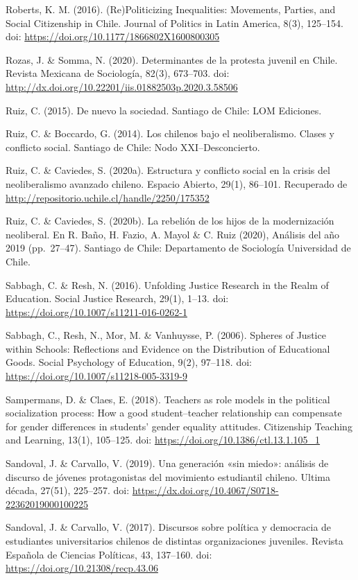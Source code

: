 \documentclass[12pt,twoside]{templates/facsothesis}
\begin{document}
Roberts, K. M. (2016). (Re)Politicizing Inequalities: Movements, Parties, and Social Citizenship in Chile. Journal of Politics in Latin America, 8(3), 125--154. doi: \url{https://doi.org/10.1177/1866802X1600800305}

Rozas, J. \& Somma, N. (2020). Determinantes de la protesta juvenil en Chile. Revista Mexicana de Sociología, 82(3), 673--703. doi: \url{http://dx.doi.org/10.22201/iis.01882503p.2020.3.58506}

Ruiz, C. (2015). De nuevo la sociedad. Santiago de Chile: LOM Ediciones.

Ruiz, C. \& Boccardo, G. (2014). Los chilenos bajo el neoliberalismo. Clases y conflicto social. Santiago de Chile: Nodo XXI--Desconcierto.

Ruiz, C. \& Caviedes, S. (2020a). Estructura y conflicto social en la crisis del neoliberalismo avanzado chileno. Espacio Abierto, 29(1), 86--101. Recuperado de \url{http://repositorio.uchile.cl/handle/2250/175352}

Ruiz, C. \& Caviedes, S. (2020b). La rebelión de los hijos de la modernización neoliberal. En R. Baño, H. Fazio, A. Mayol \& C. Ruiz (2020), Análisis del año 2019 (pp.~27--47). Santiago de Chile: Departamento de Sociología Universidad de Chile.

Sabbagh, C. \& Resh, N. (2016). Unfolding Justice Research in the Realm of Education. Social Justice Research, 29(1), 1--13. doi: \url{https://doi.org/10.1007/s11211-016-0262-1}

Sabbagh, C., Resh, N., Mor, M. \& Vanhuysse, P. (2006). Spheres of Justice within Schools: Reflections and Evidence on the Distribution of Educational Goods. Social Psychology of Education, 9(2), 97--118. doi: \url{https://doi.org/10.1007/s11218-005-3319-9}

Sampermans, D. \& Claes, E. (2018). Teachers as role models in the political socialization process: How a good student--teacher relationship can compensate for gender differences in students' gender equality attitudes. Citizenship Teaching and Learning, 13(1), 105--125. doi: \url{https://doi.org/10.1386/ctl.13.1.105_1}

Sandoval, J. \& Carvallo, V. (2019). Una generación «sin miedo»: análisis de discurso de jóvenes protagonistas del movimiento estudiantil chileno. Ultima década, 27(51), 225--257. doi: \url{https://dx.doi.org/10.4067/S0718-22362019000100225}

Sandoval, J. \& Carvallo, V. (2017). Discursos sobre política y democracia de estudiantes universitarios chilenos de distintas organizaciones juveniles. Revista Española de Ciencias Políticas, 43, 137--160. doi: \url{https://doi.org/10.21308/recp.43.06}
\end{document}
